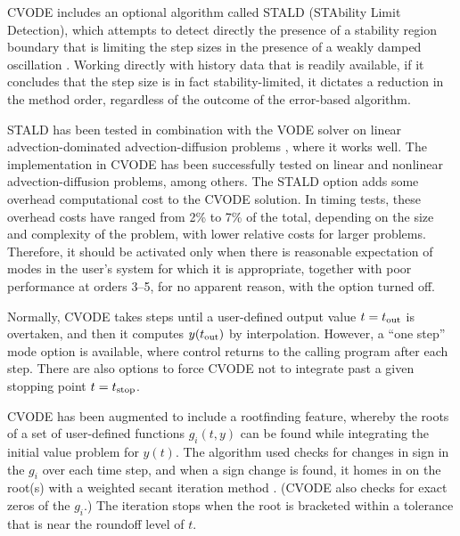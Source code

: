 CVODE includes an optional algorithm called STALD (STAbility Limit
Detection), which attempts to detect directly the presence of a
stability region boundary that is limiting the step sizes in the
presence of a weakly damped oscillation \cite{Hin:92}.  Working
directly with history data that is readily available, if it concludes
that the step size is in fact stability-limited, it dictates a
reduction in the method order, regardless of the outcome of the
error-based algorithm.

STALD has been tested in combination with the VODE solver on linear
advection-dominated advection-diffusion problems \cite{Hin:95}, where
it works well.  The implementation in CVODE has been successfully
tested on linear and nonlinear advection-diffusion problems, among others.
The STALD option adds some overhead computational cost to the CVODE
solution.  In timing tests, these overhead costs have ranged from 2\%
to 7\% of the total, depending on the size and complexity of the
problem, with lower relative costs for larger problems.  Therefore, it
should be activated only when there is reasonable expectation of modes
in the user's system for which it is appropriate, together with poor
performance at orders 3--5, for no apparent reason, with the option
turned off.

Normally, CVODE takes steps until a user-defined output value
$t = t_{\mbox{\scriptsize out}}$ is overtaken, and then it computes
$y(t_{\mbox{\scriptsize out}})$ by interpolation.  However, a
``one step'' mode option is available, where control returns to the
calling program after each step.  There are also options to force
CVODE not to integrate past a given stopping point
$t = t_{\mbox{\scriptsize stop}}$.

CVODE has been augmented to include a rootfinding feature, whereby the
roots of a set of user-defined functions $g_i(t,y)$ can be found while
integrating the initial value problem for $y(t)$.  The algorithm used
checks for changes in sign in the $g_i$ over each time step, and when
a sign change is found, it homes in on the root(s) with a weighted
secant iteration method \cite{HeSh:80}.  (CVODE also checks for exact
zeros of the $g_i$.)  The iteration stops when the root is bracketed
within a tolerance that is near the roundoff level of $t$.
